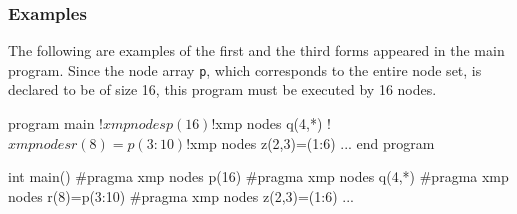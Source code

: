 \subsubsection*{Examples}

The following are examples of the first and the third forms appeared in
the main program. Since the node array {\tt p}, which corresponds to the
entire node set, is declared to be of size 16, this program must be
executed by 16 nodes.



\vspace{0.5cm}

\begin{minipage}{0.45\hsize}
\begin{center}
\begin{Fexample}
      program main
!$xmp nodes p(16)
!$xmp nodes q(4,*)
!$xmp nodes r(8)=p(3:10)
!$xmp nodes z(2,3)=(1:6)
      ...       
      end program 
\end{Fexample}
\end{center}
\end{minipage}
%
\begin{minipage}{0.45\hsize}
\begin{center}
\begin{CexampleR}
int main() {
#pragma xmp nodes p(16)
#pragma xmp nodes q(4,*)
#pragma xmp nodes r(8)=p(3:10)
#pragma xmp nodes z(2,3)=(1:6)
    ...
}
\end{CexampleR}
\end{center}
\end{minipage}

\vspace{0.5cm}

%

